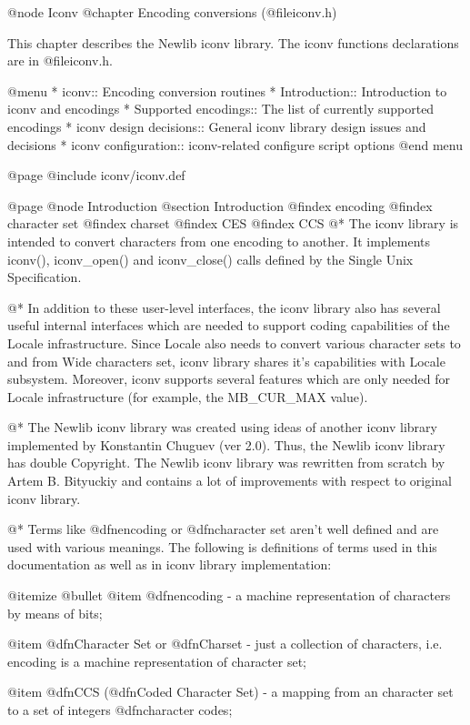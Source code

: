 @node Iconv
@chapter Encoding conversions (@file{iconv.h})

This chapter describes the Newlib iconv library.
The iconv functions declarations are in
@file{iconv.h}.

@menu
* iconv::                  Encoding conversion routines
* Introduction::           Introduction to iconv and encodings
* Supported encodings::    The list of currently supported encodings
* iconv design decisions:: General iconv library design issues and decisions
* iconv configuration::    iconv-related configure script options
@end menu

@page
@include iconv/iconv.def

@page
@node Introduction
@section Introduction
@findex encoding
@findex character set
@findex charset
@findex CES
@findex CCS
@*
The iconv library is intended to convert characters from one encoding to
another. It implements iconv(), iconv_open() and iconv_close() calls
defined by the Single Unix Specification.

@*
In addition to these user-level interfaces, the iconv library also has
several useful internal interfaces which are needed to support coding
capabilities of the Locale infrastructure. Since Locale also needs to
convert various character sets to and from Wide characters set, iconv
library shares it's capabilities with Locale subsystem. Moreover, iconv
supports several features which are only needed for Locale infrastructure
(for example, the MB_CUR_MAX value).

@*
The Newlib iconv library was created using ideas of another iconv
library implemented by Konstantin Chuguev (ver 2.0). Thus, the Newlib iconv
library has double Copyright. The Newlib iconv library was rewritten from
scratch by Artem B. Bityuckiy and contains a lot of improvements with respect
to original iconv library.

@*
Terms like @dfn{encoding} or @dfn{character set} aren't well defined and
are used with various meanings. The following is definitions of terms
used in this documentation as well as in iconv library implementation:

@itemize @bullet
@item
@dfn{encoding} - a machine representation of characters by means of bits;

@item
@dfn{Character Set} or @dfn{Charset} - just a collection of
characters, i.e. encoding is a machine representation of character set; 

@item
@dfn{CCS} (@dfn{Coded Character Set}) - a mapping from an character set to a
set of integers @dfn{character codes};

